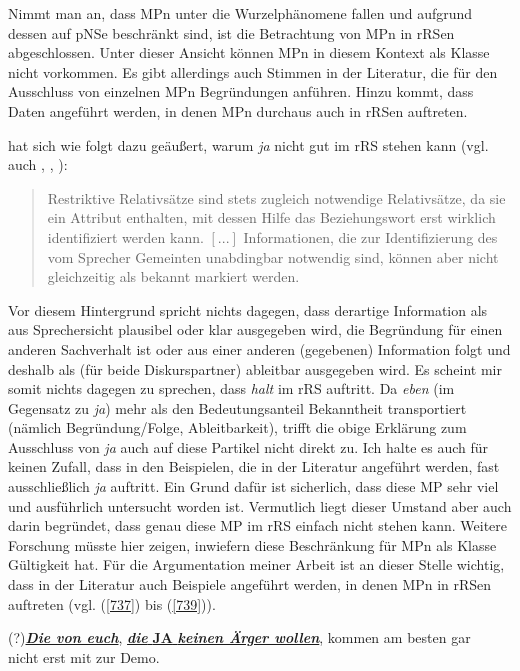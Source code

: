 Nimmt man an, dass MPn unter die Wurzelphänomene fallen und aufgrund dessen auf pNSe beschränkt sind, ist die Betrachtung von MPn in rRSen abgeschlos\-sen. Unter dieser Ansicht können MPn in diesem Kontext als Klasse nicht vorkommen. Es gibt allerdings auch Stimmen in der Literatur, die für den Ausschluss von einzelnen MPn Begründungen anführen. Hinzu kommt, dass Daten angeführt werden, in denen MPn durchaus auch in rRSen auftreten.

\citet[160]{Hentschel1986} hat sich wie folgt dazu geäußert, warum \textit{ja} nicht gut im rRS stehen kann (vgl. auch \citealt[107]{Hartmann1977}, \citealt[210]{Rinas2006}, \citealt[52]{Kwon2005}):

\begin{quotation}
Restriktive Relativsätze sind stets zugleich notwendige Relativsätze, da sie ein Attribut enthalten, mit dessen Hilfe das Beziehungswort erst wirklich identifiziert werden kann. $[...]$ Informationen, die zur Identifizierung des vom Sprecher Gemeinten unabdingbar notwendig sind, können aber nicht gleichzeitig als \glq bekannt\grq {} markiert werden.
\end{quotation}
Vor diesem Hintergrund spricht nichts dagegen, dass derartige Information als aus Sprechersicht plausibel oder klar ausgegeben wird, die Begründung für einen anderen Sachverhalt ist oder aus einer anderen (gegebenen) Information folgt und deshalb als (für beide Diskurspartner) ableitbar ausgegeben wird. Es scheint mir somit nichts dagegen zu sprechen, dass \textit{halt} im rRS auftritt. Da \textit{eben} (im Gegensatz zu \textit{ja}) mehr als den Bedeutungsanteil \glq Bekanntheit\grq {} transportiert (nämlich Begründung/Folge, Ableitbarkeit), trifft die obige Erklärung zum Ausschluss von \textit{ja} auch auf diese Partikel nicht direkt zu. Ich halte es auch für keinen Zufall, dass in den Beispielen, die in der Literatur angeführt werden, fast ausschließlich \textit{ja} auftritt. Ein Grund dafür ist sicherlich, dass diese MP sehr viel und ausführlich untersucht worden ist. Vermutlich liegt dieser Umstand aber auch darin begründet, dass genau diese MP im rRS einfach nicht stehen kann. Weitere Forschung müsste hier zeigen, inwiefern diese Beschränkung für MPn als Klasse Gültigkeit hat. Für die Argumentation meiner Arbeit ist an dieser Stelle wichtig, dass in der Literatur auch Beispiele angeführt werden, in denen MPn in rRSen auftreten (vgl. (\ref{737}) bis (\ref{739})).

\begin{exe}
	\ex\label{737} 
	(?)\underline{\textbf{\textit{Die von euch}}}, \underline{{\textit{\textbf{die}} \textbf{JA} \textit{\textbf{keinen Ärger wollen}}}}, kommen am besten gar \\nicht erst mit zur Demo.
	\hfill\hbox {\citet[202]{Hentschel1986}}
\end{exe}


